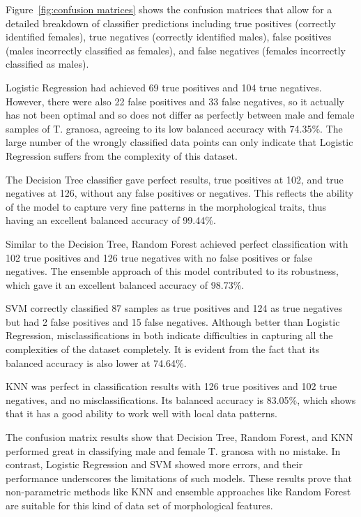 Figure~\ref{fig:confusion matrices} shows the confusion matrices that allow for a detailed breakdown of classifier predictions including true positives (correctly identified females), true negatives (correctly identified males), false positives (males incorrectly classified as females), and false negatives (females incorrectly classified as males).

Logistic Regression had achieved 69 true positives and 104 true negatives. However, there were also 22 false positives and 33 false negatives, so it actually has not been optimal and so does not differ as perfectly between male and female samples of T. granosa, agreeing to its low balanced accuracy with 74.35\%. The large number of the wrongly classified data points can only indicate that Logistic Regression suffers from the complexity of this dataset.

The Decision Tree classifier gave perfect results, true positives at 102, and true negatives at 126, without any false positives or negatives. This reflects the ability of the model to capture very fine patterns in the morphological traits, thus having an excellent balanced accuracy of 99.44\%.

Similar to the Decision Tree, Random Forest achieved perfect classification with 102 true positives and 126 true negatives with no false positives or false negatives. The ensemble approach of this model contributed to its robustness, which gave it an excellent balanced accuracy of 98.73\%.

SVM correctly classified 87 samples as true positives and 124 as true negatives but had 2 false positives and 15 false negatives. Although better than Logistic Regression, misclassifications in both indicate difficulties in capturing all the complexities of the dataset completely. It is evident from the fact that its balanced accuracy is also lower at 74.64\%.

KNN was perfect in classification results with 126 true positives and 102 true negatives, and no misclassifications. Its balanced accuracy is 83.05\%, which shows that it has a good ability to work well with local data patterns.

The confusion matrix results show that Decision Tree, Random Forest, and KNN performed great in classifying male and female T. granosa with no mistake. In contrast, Logistic Regression and SVM showed more errors, and their performance underscores the limitations of such models. These results prove that non-parametric methods like KNN and ensemble approaches like Random Forest are suitable for this kind of data set of morphological features.

